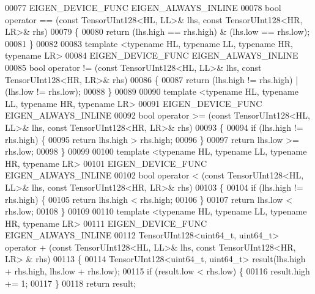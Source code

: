 \begin{DoxyCode}
00077 EIGEN\_DEVICE\_FUNC EIGEN\_ALWAYS\_INLINE
00078 \textcolor{keywordtype}{bool} operator == (\textcolor{keyword}{const} TensorUInt128<HL, LL>& lhs, \textcolor{keyword}{const} TensorUInt128<HR, LR>& rhs)
00079 \{
00080   \textcolor{keywordflow}{return} (lhs.high == rhs.high) & (lhs.low == rhs.low);
00081 \}
00082 
00083 \textcolor{keyword}{template} <\textcolor{keyword}{typename} HL, \textcolor{keyword}{typename} LL, \textcolor{keyword}{typename} HR, \textcolor{keyword}{typename} LR>
00084 EIGEN\_DEVICE\_FUNC EIGEN\_ALWAYS\_INLINE
00085 \textcolor{keywordtype}{bool} operator != (\textcolor{keyword}{const} TensorUInt128<HL, LL>& lhs, \textcolor{keyword}{const} TensorUInt128<HR, LR>& rhs)
00086 \{
00087   \textcolor{keywordflow}{return} (lhs.high != rhs.high) | (lhs.low != rhs.low);
00088 \}
00089 
00090 \textcolor{keyword}{template} <\textcolor{keyword}{typename} HL, \textcolor{keyword}{typename} LL, \textcolor{keyword}{typename} HR, \textcolor{keyword}{typename} LR>
00091 EIGEN\_DEVICE\_FUNC EIGEN\_ALWAYS\_INLINE
00092 \textcolor{keywordtype}{bool} operator >= (\textcolor{keyword}{const} TensorUInt128<HL, LL>& lhs, \textcolor{keyword}{const} TensorUInt128<HR, LR>& rhs)
00093 \{
00094   \textcolor{keywordflow}{if} (lhs.high != rhs.high) \{
00095     \textcolor{keywordflow}{return} lhs.high > rhs.high;
00096   \}
00097   \textcolor{keywordflow}{return} lhs.low >= rhs.low;
00098 \}
00099 
00100 \textcolor{keyword}{template} <\textcolor{keyword}{typename} HL, \textcolor{keyword}{typename} LL, \textcolor{keyword}{typename} HR, \textcolor{keyword}{typename} LR>
00101 EIGEN\_DEVICE\_FUNC EIGEN\_ALWAYS\_INLINE
00102 \textcolor{keywordtype}{bool} operator < (const TensorUInt128<HL, LL>& lhs, \textcolor{keyword}{const} TensorUInt128<HR, LR>& rhs)
00103 \{
00104   \textcolor{keywordflow}{if} (lhs.high != rhs.high) \{
00105     \textcolor{keywordflow}{return} lhs.high < rhs.high;
00106   \}
00107   \textcolor{keywordflow}{return} lhs.low < rhs.low;
00108 \}
00109 
00110 \textcolor{keyword}{template} <\textcolor{keyword}{typename} HL, \textcolor{keyword}{typename} LL, \textcolor{keyword}{typename} HR, \textcolor{keyword}{typename} LR>
00111 EIGEN\_DEVICE\_FUNC EIGEN\_ALWAYS\_INLINE
00112 TensorUInt128<uint64\_t, uint64\_t> operator + (\textcolor{keyword}{const} TensorUInt128<HL, LL>& lhs, \textcolor{keyword}{const} TensorUInt128<HR, LR>
      & rhs)
00113 \{
00114   TensorUInt128<uint64\_t, uint64\_t> result(lhs.high + rhs.high, lhs.low + rhs.low);
00115   \textcolor{keywordflow}{if} (result.low < rhs.low) \{
00116     result.high += 1;
00117   \}
00118   \textcolor{keywordflow}{return} result;

\end{DoxyCode}
